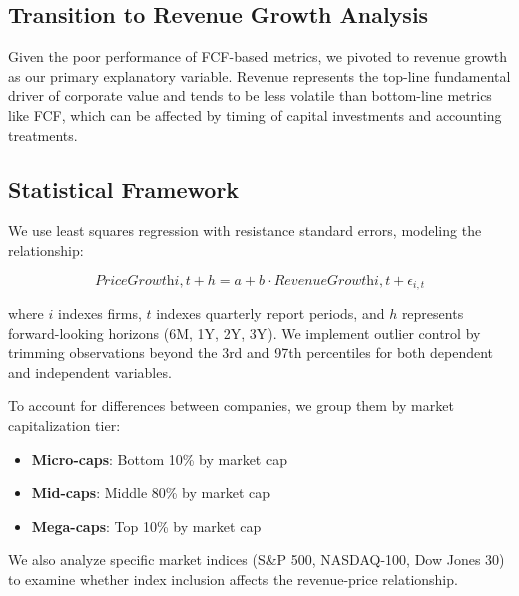\documentclass[11pt]{article}
\begin{document}
\subsection{Transition to Revenue Growth Analysis}

Given the poor performance of FCF-based metrics, we pivoted to revenue growth as our primary explanatory variable. Revenue represents the top-line fundamental driver of corporate value and tends to be less volatile than bottom-line metrics like FCF, which can be affected by timing of capital investments and accounting treatments.

\subsection{Statistical Framework}

We use least squares regression with resistance standard errors, modeling the relationship:

\begin{equation}
\textit{PriceGrowth}{i,t+h} = a + b \cdot \textit{RevenueGrowth}{i,t} + \epsilon_{i,t}
\end{equation}

where $i$ indexes firms, $t$ indexes quarterly report periods, and $h$ represents forward-looking horizons (6M, 1Y, 2Y, 3Y). We implement outlier control by trimming observations beyond the 3rd and 97th percentiles for both dependent and independent variables.

To account for differences between companies, we group them by market capitalization tier:
\begin{itemize}
\item \textbf{Micro-caps}: Bottom 10\% by market cap
\item \textbf{Mid-caps}: Middle 80\% by market cap  
\item \textbf{Mega-caps}: Top 10\% by market cap
\end{itemize}

We also analyze specific market indices (S\&P 500, NASDAQ-100, Dow Jones 30) to examine whether index inclusion affects the revenue-price relationship.


\end{document}
